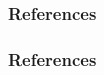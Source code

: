 
\begin{frame}
    \frametitle{References}
    \addtocounter{nframe}{1}
    \begin{thebibliography}{10}
    \end{thebibliography}

\end{frame}

\begin{frame}
    \frametitle{References}
    \addtocounter{nframe}{1}
    \begin{thebibliography}{10}
    \end{thebibliography}

\end{frame}
